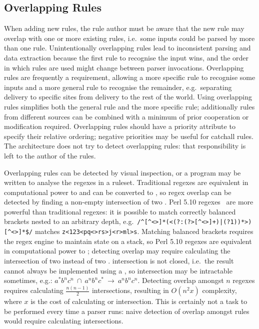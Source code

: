 \subsection{Overlapping Rules}

\label{overlapping rules in architecture}

When adding new rules, the rule author must be aware that the new rule may
overlap with one or more existing rules, i.e.\ some inputs could be parsed
by more than one rule.  Unintentionally overlapping rules lead to
inconsistent parsing and data extraction because the first rule to
recognise the input wins, and the order in which rules are used might
change between parser invocations.  Overlapping rules are frequently a
requirement, allowing a more specific rule to recognise some inputs and a
more general rule to recognise the remainder, e.g.\ separating
 delivery to specific sites from  delivery to
the rest of the world.  Using overlapping rules simplifies both the general
rule and the more specific rule; additionally rules from different sources
can be combined with a minimum of prior cooperation or modification
required.  Overlapping rules should have a priority attribute to specify
their relative ordering; negative priorities may be useful for catchall
rules.  The architecture does not try to detect overlapping rules: that
responsibility is left to the author of the rules.

Overlapping rules can be detected by visual inspection, or a program may be
written to analyse the regexes in a ruleset.  Traditional regexes are
equivalent in computational power to  and can be converted to
, so regex overlap can be detected by finding a non-empty
intersection of two \@.  Perl 5.10 regexes~\cite{perlre} are
more powerful than traditional regexes: it is possible to match correctly
balanced brackets nested to an arbitrary depth, e.g.\
\verb!/^[^<>]*(<(?:(?>[^<>]+)|(?1))*>)[^<>]*$/!  matches
\verb!z<123<pq<>rs>j<r>ml>s!.  Matching balanced brackets requires the
regex engine to maintain state on a stack, so Perl 5.10 regexes are
equivalent in computational power to ; detecting overlap may
require calculating the intersection of two  instead of two
\acronym{FA}.   intersection is not closed, i.e.\ the result
cannot always be implemented using a \acronym{PDA}, so intersection may be
intractable sometimes, e.g.:
$a^{*}b^{n}c^{n}~\cap~a^{n}b^{n}c^{*}~\rightarrow~a^{n}b^{n}c^{n}$.
Detecting overlap amongst $n$ regexes requires calculating
$\frac{n\left(n-1\right)}{2}$ intersections, resulting in
$O\left(n^{2}x\right)$ complexity, where $x$ is the cost of calculating
\acronym{FA} or \acronym{PDA} intersection.  This is certainly not a task
to be performed every time a parser runs: naive detection of overlap
amongst \parsernames{} \numberOFrules{} rules would require calculating
\numberOFruleINTERSECTIONS{} intersections.

